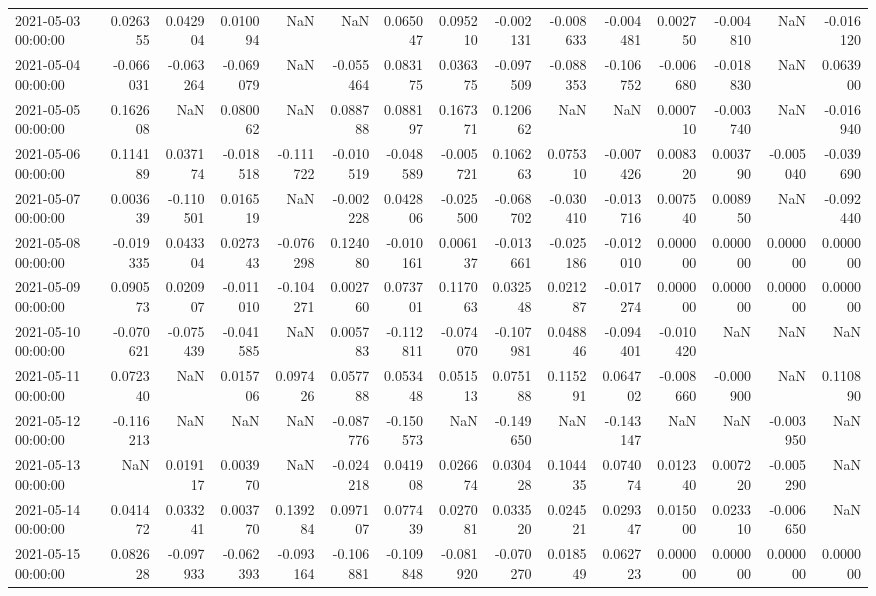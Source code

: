 \begin{tabular}{lrrrrrrrrrrrrrr}
2021-05-03 00:00:00 & 0.026355 & 0.042904 & 0.010094 & NaN & NaN & 0.065047 & 0.095210 & -0.002131 & -0.008633 & -0.004481 & 0.002750 & -0.004810 & NaN & -0.016120 \\
2021-05-04 00:00:00 & -0.066031 & -0.063264 & -0.069079 & NaN & -0.055464 & 0.083175 & 0.036375 & -0.097509 & -0.088353 & -0.106752 & -0.006680 & -0.018830 & NaN & 0.063900 \\
2021-05-05 00:00:00 & 0.162608 & NaN & 0.080062 & NaN & 0.088788 & 0.088197 & 0.167371 & 0.120662 & NaN & NaN & 0.000710 & -0.003740 & NaN & -0.016940 \\
2021-05-06 00:00:00 & 0.114189 & 0.037174 & -0.018518 & -0.111722 & -0.010519 & -0.048589 & -0.005721 & 0.106263 & 0.075310 & -0.007426 & 0.008320 & 0.003790 & -0.005040 & -0.039690 \\
2021-05-07 00:00:00 & 0.003639 & -0.110501 & 0.016519 & NaN & -0.002228 & 0.042806 & -0.025500 & -0.068702 & -0.030410 & -0.013716 & 0.007540 & 0.008950 & NaN & -0.092440 \\
2021-05-08 00:00:00 & -0.019335 & 0.043304 & 0.027343 & -0.076298 & 0.124080 & -0.010161 & 0.006137 & -0.013661 & -0.025186 & -0.012010 & 0.000000 & 0.000000 & 0.000000 & 0.000000 \\
2021-05-09 00:00:00 & 0.090573 & 0.020907 & -0.011010 & -0.104271 & 0.002760 & 0.073701 & 0.117063 & 0.032548 & 0.021287 & -0.017274 & 0.000000 & 0.000000 & 0.000000 & 0.000000 \\
2021-05-10 00:00:00 & -0.070621 & -0.075439 & -0.041585 & NaN & 0.005783 & -0.112811 & -0.074070 & -0.107981 & 0.048846 & -0.094401 & -0.010420 & NaN & NaN & NaN \\
2021-05-11 00:00:00 & 0.072340 & NaN & 0.015706 & 0.097426 & 0.057788 & 0.053448 & 0.051513 & 0.075188 & 0.115291 & 0.064702 & -0.008660 & -0.000900 & NaN & 0.110890 \\
2021-05-12 00:00:00 & -0.116213 & NaN & NaN & NaN & -0.087776 & -0.150573 & NaN & -0.149650 & NaN & -0.143147 & NaN & NaN & -0.003950 & NaN \\
2021-05-13 00:00:00 & NaN & 0.019117 & 0.003970 & NaN & -0.024218 & 0.041908 & 0.026674 & 0.030428 & 0.104435 & 0.074074 & 0.012340 & 0.007220 & -0.005290 & NaN \\
2021-05-14 00:00:00 & 0.041472 & 0.033241 & 0.003770 & 0.139284 & 0.097107 & 0.077439 & 0.027081 & 0.033520 & 0.024521 & 0.029347 & 0.015000 & 0.023310 & -0.006650 & NaN \\
2021-05-15 00:00:00 & 0.082628 & -0.097933 & -0.062393 & -0.093164 & -0.106881 & -0.109848 & -0.081920 & -0.070270 & 0.018549 & 0.062723 & 0.000000 & 0.000000 & 0.000000 & 0.000000 \\

\end{tabular}

